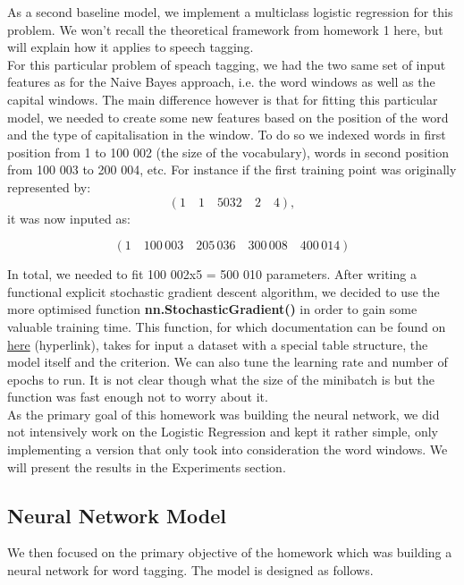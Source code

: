 \documentclass[11pt]{article}
\begin{document}
As a second baseline model, we implement a multiclass logistic regression for this problem. We won't recall the theoretical framework from homework 1 here, but will explain how it applies to speech tagging.\\

\noindent For this particular problem of speach tagging, we had the two same set of input features as for the Naive Bayes approach, i.e. the word windows as well as the capital windows. The main difference however is that for fitting this particular model, we needed to create some new features based on the position of the word and the type of capitalisation in the window. To do so we indexed words in first position from 1 to 100 002 (the size of the vocabulary), words in second position from 100 003 to 200 004, etc. For instance if the first training point was originally represented by: 
$$ \left(1 \quad 1 \quad 5032 \quad 2 \quad 4\right),$$ \noindent it was now inputed as:

$$ \left(1 \quad 100\, 003 \quad 205\, 036 \quad 300\, 008 \quad 400\, 014\right)$$

\noindent In total, we needed to fit 100 002x5 = 500 010 parameters. After writing a functional explicit stochastic gradient descent algorithm, we decided to use the more optimised function \newline \textbf{nn.StochasticGradient()} in order to gain some valuable training time. This function, for which documentation can be found on \href{https://github.com/torch/nn/blob/master/doc/training.md}{here} (hyperlink), takes for input a dataset with a special table structure, the model itself and the criterion. We can also tune the learning rate and number of epochs to run. It is not clear though what the size of the minibatch is but the function was fast enough not to worry about it.\\

\noindent As the primary goal of this homework was building the neural network, we did not intensively work on the Logistic Regression and kept it rather simple, only implementing a version that only took into consideration the word windows. We will present the results in the Experiments section.
 
\subsection{Neural Network Model}

We then focused on the primary objective of the homework which was building a neural network for word tagging. The model is designed as follows. \\
\end{document}
